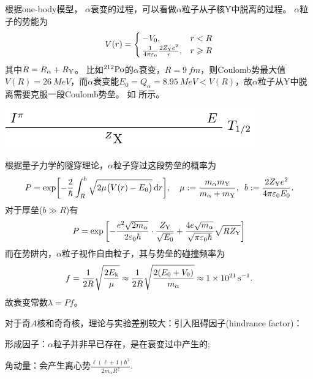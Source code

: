 根据one-body模型，
$\alpha$衰变的过程，可以看做$\alpha$粒子从子核Y中脱离的过程。
$\alpha$粒子的势能为
\begin{align}
	V(r)=\begin{cases}
		-V_0,&r<R\\
		\frac1{4\pi\varepsilon_0}\frac{2Z_{\mathrm{Y}}e^2}r,&r\geqslant R
	\end{cases}
\end{align}
其中$R=R_\alpha+R_{\mathrm{Y}}$。
比如${^{212}\mathrm{Po}}$的$\alpha$衰变，$R=\SI{9}{fm}$，则Coulomb势最大值$V(R)=\SI{26}{MeV}$，而$\alpha$衰变能$E_0=Q_\alpha=\SI{8.95}{MeV}<V(R)$，故$\alpha$粒子从Y中脱离需要克服一段Coulomb势垒。
如 所示。
\begin{center}
	\includegraphics[page=5]{figures/tikz/layouts.pdf}
	\label{fig:Coulomb well}
\end{center}
根据量子力学的隧穿理论，$\alpha$粒子穿过这段势垒的概率为
\begin{equation}
	P=\exp\biggl[-\frac2\hbar\int_R^b\sqrt{2\mu\bigl(V(r)-E_0\bigr)}\mathop{}\!\mathrm{d} r\biggr],\quad 
	\mu:=\frac{m_\alpha m_{\mathrm{Y}}}{m_\alpha+m_{\mathrm{Y}}},\enspace
	b:=\frac{2Z_{\mathrm{Y}}e^2}{4\pi\varepsilon_0 E_0}.
\end{equation}
对于厚垒($b\gg R$)有
\begin{equation}
	P=\exp\left[-\frac{e^2\sqrt{2m_\alpha}}{2\varepsilon_0\hbar}\cdot\frac{Z_{\mathrm{Y}}}{\sqrt{E_0}}+\frac{4e\sqrt{m_\alpha }}{\sqrt{\pi\varepsilon_0\hbar}}\sqrt{RZ_{\mathrm{Y}}}\right]
\end{equation}
而在势阱内，$\alpha$粒子视作自由粒子，其与势垒的碰撞频率为
\begin{equation}
	f=\frac1{2R}\sqrt{\frac{2E_{\mathrm k}}{\mu}}\approx\frac1{2R}\sqrt{\frac{2(E_0+V_0)}{m_\alpha}}\approx\SI{1e21}{s^{-1}}.
\end{equation}
故衰变常数$\lambda=Pf$。

\begin{remark}
	对于奇$A$核和奇奇核，理论与实验差别较大：引入阻碍因子(hindrance factor)：
	\begin{compactenum}
		\item 形成因子：$\alpha$粒子并非早已存在，是在衰变过中产生的;
		\item 角动量：会产生离心势$\frac{\ell(\ell+1)\hbar^2}{2m_\alpha R^2}.$
	\end{compactenum}
\end{remark}
